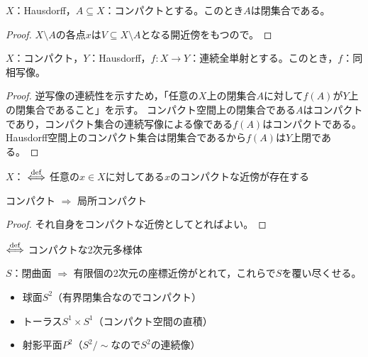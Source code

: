 \documentclass[uplatex]{jsarticle}
\begin{document}
\begin{corr}
  $X$：Hausdorff，$A \subseteq X$：コンパクトとする。このとき$A$は閉集合である。
\end{corr}

\begin{proof}
  $X \setminus A$の各点$x$は$V \subseteq X \setminus A$となる開近傍をもつので。
\end{proof}

\begin{corr}
  $X$：コンパクト，$Y$：Hausdorff，$f \colon X \longrightarrow Y$：連続全単射とする。このとき，$f$：同相写像。
\end{corr}

\begin{proof}
  逆写像の連続性を示すため，「任意の$X$上の閉集合$A$に対して$f(A)$が$Y$上の閉集合であること」を示す。
  コンパクト空間上の閉集合である$A$はコンパクトであり，コンパクト集合の連続写像による像である$f(A)$はコンパクトである。
  Hausdorff空間上のコンパクト集合は閉集合であるから$f(A)$は$Y$上閉である。
\end{proof}

\begin{teigi}[局所コンパクト]
  $X$：  $\overset{\mathrm{def}}{\Longleftrightarrow}$ 任意の$x \in X$に対してある$x$のコンパクトな近傍が存在する
\end{teigi}

\begin{prop}
  コンパクト $\Longrightarrow$ 局所コンパクト
\end{prop}

\begin{proof}
  それ自身をコンパクトな近傍としてとればよい。
\end{proof}

\sukima {}

\begin{teigi}[閉曲面]
   $\overset{\mathrm{def}}{\Longleftrightarrow}$ コンパクトな2次元多様体
\end{teigi}

$S$：閉曲面 $\Longrightarrow$ 有限個の2次元の座標近傍がとれて，これらで$S$を覆い尽くせる。

\begin{rei}
  \begin{itemize}
    \item 球面$S^{2}$（有界閉集合なのでコンパクト）
    \item トーラス$S^{1} \times S^{1}$（コンパクト空間の直積）
    \item 射影平面$P^{2}$（$S^{2}/\sim$なので$S^{2}$の連続像）
  \end{itemize}
\end{rei}
\end{document}
